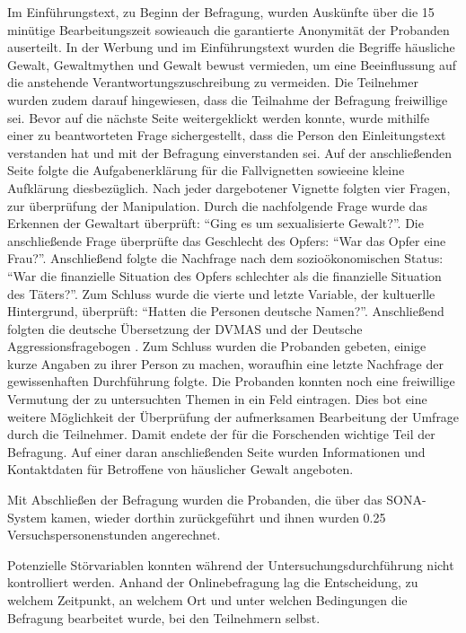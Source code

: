 Im Einführungstext, zu Beginn der Befragung, wurden Auskünfte über die 15 minütige Bearbeitungszeit sowieauch die garantierte Anonymität der Probanden auserteilt. In der Werbung und im Einführungstext wurden die Begriffe häusliche Gewalt, Gewaltmythen und Gewalt bewust vermieden, um eine Beeinflussung auf die anstehende Verantwortungszuschreibung zu vermeiden. Die Teilnehmer wurden zudem darauf hingewiesen, dass die Teilnahme der Befragung freiwillige sei. Bevor auf die nächste Seite weitergeklickt werden konnte, wurde mithilfe einer zu beantworteten Frage sichergestellt, dass die Person den Einleitungstext verstanden hat und mit der Befragung einverstanden sei. Auf der anschließenden Seite folgte die Aufgabenerklärung für die Fallvignetten sowieeine kleine Aufklärung diesbezüglich. Nach jeder dargebotener Vignette folgten vier Fragen, zur überprüfung der Manipulation. Durch die nachfolgende Frage wurde das Erkennen der Gewaltart überprüft: \enquote{Ging es um sexualisierte Gewalt?}. Die anschließende Frage überprüfte das Geschlecht des Opfers: \enquote{War das Opfer eine Frau?}. Anschließend folgte die Nachfrage nach dem sozioökonomischen Status: \enquote{War die finanzielle Situation des Opfers schlechter als die finanzielle Situation des Täters?}. Zum Schluss wurde die vierte und letzte Variable, der kultuerlle Hintergrund, überprüft: \enquote{Hatten die Personen deutsche Namen?}. Anschließend folgten die deutsche Übersetzung der DVMAS \parencite{Peters2003} und der Deutsche Aggressionsfragebogen \parencite{Aggressionsfragebogen}. Zum Schluss wurden die Probanden gebeten, einige kurze Angaben zu ihrer Person zu machen, woraufhin eine letzte Nachfrage der gewissenhaften Durchführung folgte. Die Probanden konnten noch eine freiwillige Vermutung der zu untersuchten Themen in ein Feld eintragen. Dies bot eine weitere Möglichkeit der Überprüfung der aufmerksamen Bearbeitung der Umfrage durch die Teilnehmer. Damit endete der für die Forschenden wichtige Teil der Befragung. Auf einer daran anschließenden Seite wurden Informationen und Kontaktdaten für Betroffene von häuslicher Gewalt angeboten. 

Mit Abschließen der Befragung wurden die Probanden, die über das SONA-System kamen, wieder dorthin zurückgeführt und ihnen wurden 0.25 Versuchspersonenstunden angerechnet.

Potenzielle Störvariablen konnten während der Untersuchungsdurchführung nicht kontrolliert werden. Anhand der Onlinebefragung lag die Entscheidung, zu welchem Zeitpunkt, an welchem Ort und unter welchen Bedingungen die Befragung bearbeitet wurde, bei den Teilnehmern selbst.


